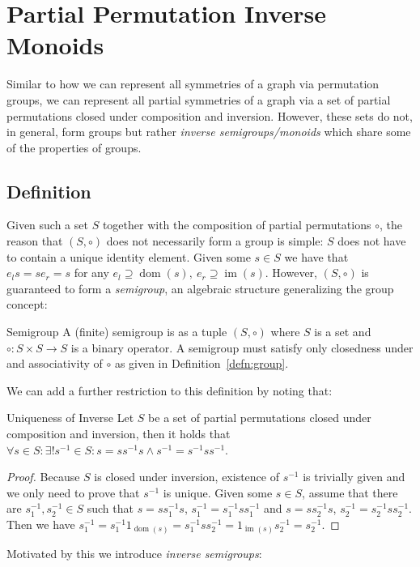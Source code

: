 \section{Partial Permutation Inverse Monoids}
\label{sec:theo_partial_permutation_inverse_monoids}

Similar to how we can represent all symmetries of a graph via permutation
groups, we can represent all partial symmetries of a graph via a set of partial
permutations closed under composition and inversion. However, these sets do
not, in general, form groups but rather \textit{inverse semigroups/monoids}
which share some of the properties of groups.

\subsection{Definition}

Given such a set $S$ together with the composition of partial permutations
$\circ$, the reason that $(S, \circ)$ does not necessarily form a group is
simple: $S$ does not have to contain a unique identity element. Given some $s
\in S$ we have that $e_ls = se_r = s$ for any $e_l \supseteq
\operatorname{dom}(s),\ e_r \supseteq \operatorname{im}(s)$. However, $(S,
\circ)$ is guaranteed to form a \textit{semigroup}, an algebraic structure
generalizing the group concept:

\begin{defn}{Semigroup}
A (finite) semigroup is as a tuple $(S, \circ)$ where $S$ is a set and
$\circ: S \times S \rightarrow S$ is a binary operator. A semigroup must
satisfy only closedness under and associativity of $\circ$ as given in
Definition~\ref{defn:group}.
\end{defn}
%
We can add a further restriction to this definition by noting that:

\begin{lemma}{Uniqueness of Inverse}
  Let $S$ be a set of partial permutations closed under composition and
  inversion, then it holds that $\forall s \in S: \exists! s^{-1} \in S: s = s
  s^{-1} s \land s^{-1} = s^{-1} s s^{-1}$.
\end{lemma}

\begin{proof}
  Because $S$ is closed under inversion, existence of $s^{-1}$ is trivially
  given and we only need to prove that $s^{-1}$ is unique. Given some $s \in S$,
  assume that there are $s^{-1}_1, s^{-1}_2 \in S$ such that $s = s s^{-1}_1 s$,
  $s^{-1}_1 = s^{-1}_1 s s^{-1}_1$ and $s = s s^{-1}_2 s$, $s^{-1}_2 = s^{-1}_2 s
  s^{-1}_2$. Then we have $s^{-1}_1 = s^{-1}_1 1_{\operatorname{dom}(s)} =
  s^{-1}_1 s s^{-1}_2 = 1_{\operatorname{im}(s)} s^{-1}_2 = s^{-1}_2$.
\end{proof}
%
Motivated by this we introduce \textit{inverse semigroups}:


